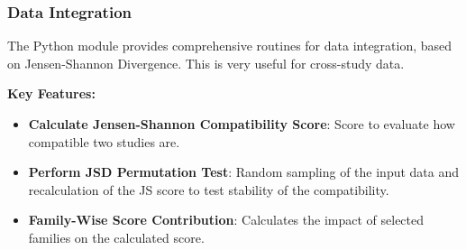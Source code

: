 \subsubsection{Data Integration}
The Python module provides comprehensive routines for data integration, based on Jensen-Shannon Divergence. This is very useful for cross-study data.

\textbf{Key Features:}
\begin{itemize}
    \item \textbf{Calculate Jensen-Shannon Compatibility Score}: Score to evaluate how compatible two studies are.
    \item \textbf{Perform JSD Permutation Test}: Random sampling of the input data and recalculation of the JS score to test stability of the compatibility.
    \item \textbf{Family-Wise Score Contribution}: Calculates the impact of selected families on the calculated score.
\end{itemize}

